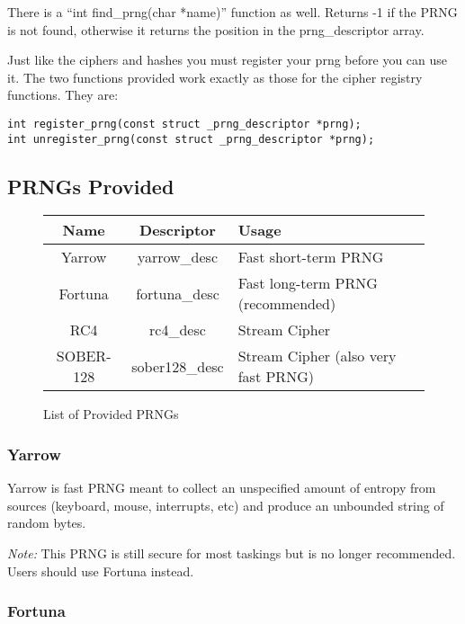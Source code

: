 \documentclass[a4paper]{book}
\begin{document}
There is a ``int find\_prng(char *name)'' function as well.  Returns -1 if the PRNG is not found, otherwise it returns
the position in the prng\_descriptor array.

Just like the ciphers and hashes you must register your prng before you can use it.  The two functions provided work
exactly as those for the cipher registry functions.  They are:
\begin{verbatim}
int register_prng(const struct _prng_descriptor *prng);
int unregister_prng(const struct _prng_descriptor *prng);
\end{verbatim}

\subsection{PRNGs Provided}
\begin{figure}[here]
\begin{center}
\begin{small}
\begin{tabular}{|c|c|l|}
\hline \textbf{Name} & \textbf{Descriptor} & \textbf{Usage} \\
\hline Yarrow & yarrow\_desc & Fast short-term PRNG \\
\hline Fortuna & fortuna\_desc & Fast long-term PRNG (recommended) \\
\hline RC4 & rc4\_desc & Stream Cipher \\
\hline SOBER-128 & sober128\_desc & Stream Cipher (also very fast PRNG) \\
\hline
\end{tabular}
\end{small}
\end{center}
\caption{List of Provided PRNGs}
\end{figure}

\subsubsection{Yarrow}
Yarrow is fast PRNG meant to collect an unspecified amount of entropy from sources 
(keyboard, mouse, interrupts, etc) and produce an unbounded string of random bytes.  

\textit{Note:} This PRNG is still secure for most taskings but is no longer recommended.  Users
should use Fortuna instead.

\subsubsection{Fortuna}
\end{document}

